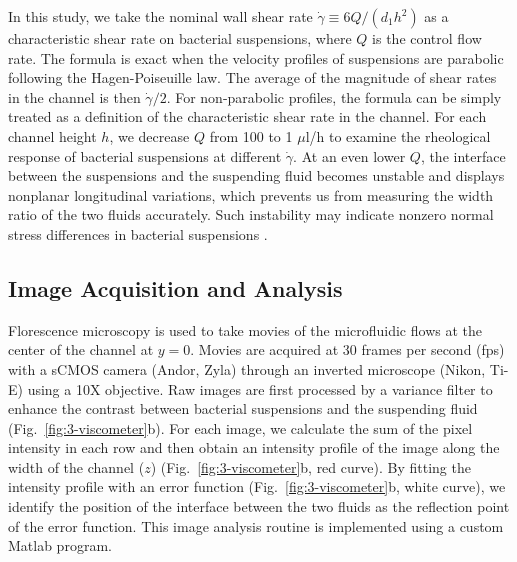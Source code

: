 In this study, we take the nominal wall shear rate $\dot\gamma\equiv 6Q/(d_1h^2)$ as a characteristic shear rate on bacterial suspensions, where $Q$ is the control flow rate. The formula is exact when
the velocity profiles of suspensions are parabolic following the Hagen-Poiseuille law. The average of the magnitude of shear rates in the channel is then $\dot\gamma/2$. For non-parabolic profiles, the formula can be simply treated as a definition of the characteristic shear rate in the channel. For each channel height $h$, we decrease $Q$ from 100 to 1 $\mu$l/h to examine the
rheological response of bacterial suspensions at different $\dot\gamma$. At an even lower $Q$, the interface between the suspensions and the suspending fluid becomes unstable and displays nonplanar
longitudinal variations, which prevents us from measuring the width ratio of the two fluids accurately. Such instability may indicate nonzero normal stress differences in bacterial suspensions \cite{Hinch1992, Brady2002, Saintillan2010}.

\subsection{Image Acquisition and Analysis}
Florescence microscopy is used to take movies of the microfluidic flows at the center of the channel at $y = 0$. Movies are acquired at 30 frames per second (fps) with a sCMOS camera (Andor, Zyla) through an inverted microscope (Nikon, Ti-E) using a 10X objective. Raw images are first processed by a variance filter to enhance the contrast between bacterial suspensions and the suspending fluid (Fig.~\ref{fig:3-viscometer}b). For each image, we calculate the sum of the pixel intensity in each row and then obtain an intensity profile of the image along the width of the channel ($z$) (Fig.~\ref{fig:3-viscometer}b, red curve). By fitting the intensity profile with an error function (Fig.~\ref{fig:3-viscometer}b, white curve), we identify the position of the interface between the two fluids as the reflection point of the error function. This image analysis routine is implemented using a custom Matlab program.

